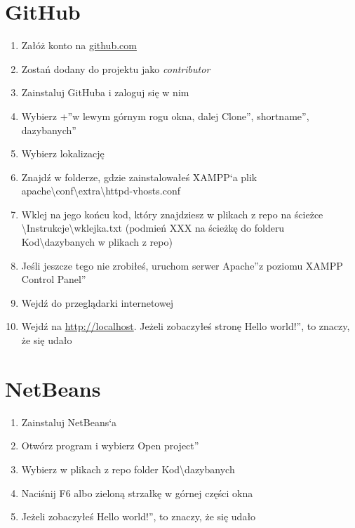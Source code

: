 \documentclass[a4paper, 11pt]{article}
\begin{document}
	\section{GitHub}
	\begin{enumerate}
		\item Załóż konto na \url{github.com}
		\item Zostań dodany do projektu jako \emph{contributor}
		\item Zainstaluj GitHuba i zaloguj się w nim
		\item Wybierz  \quotedblbase +\textquotedblright w lewym górnym rogu okna, dalej \quotedblbase Clone\textquotedblright, \quotedblbase shortname\textquotedblright, \quotedblbase dazybanych\textquotedblright
		\item Wybierz lokalizację
		\item Znajdź w folderze, gdzie zainstalowałeś XAMPP`a plik apache\textbackslash conf\textbackslash extra\textbackslash httpd-vhosts.conf
		\item Wklej na jego końcu kod, który znajdziesz w plikach z repo na ścieżce \textbackslash Instrukcje\textbackslash wklejka.txt (podmień XXX na ścieżkę do folderu Kod\textbackslash dazybanych w plikach z repo)
		\item Jeśli jeszcze tego nie zrobiłeś, uruchom serwer \quotedblbase Apache\textquotedblright z poziomu \quotedblbase XAMPP Control Panel\textquotedblright
		\item Wejdź do przeglądarki internetowej
		\item Wejdź na \url{http://localhost}. Jeżeli zobaczyłeś stronę \quotedblbase Hello world!\textquotedblright, to znaczy, że się udało
	\end{enumerate}
	\section{NetBeans}
	\begin{enumerate}
		\item Zainstaluj NetBeans`a
		\item Otwórz program i wybierz \quotedblbase Open project\textquotedblright
		\item Wybierz w plikach z repo folder Kod\textbackslash dazybanych
		\item Naciśnij F6 albo zieloną strzałkę w górnej części okna
		\item Jeżeli zobaczyłeś \quotedblbase Hello world!\textquotedblright, to znaczy, że się udało 
	\end{enumerate}
\end{document}
